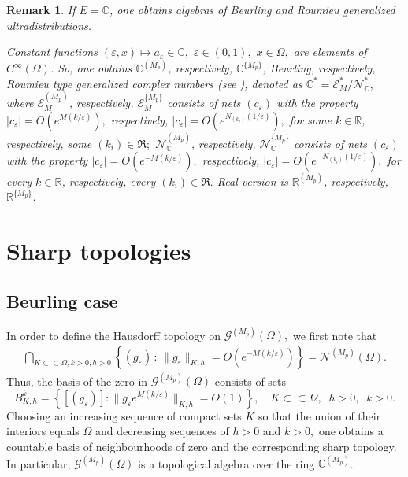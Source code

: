 \documentclass[sn-mathphys,Numbered]{sn-jnl}%
\theoremstyle{thmstyleone}%
\theoremstyle{thmstyletwo}%
\newtheorem{remark}{Remark}%
\theoremstyle{thmstylethree}%
\begin{document}
\begin{remark} \label{tc}
If $E=\mathbb C$, one obtains algebras   of Beurling  and Roumieu generalized ultradistributions.

Constant functions  $(\varepsilon,x)\mapsto a_\varepsilon\in \mathbb{C}, $ $\varepsilon\in(0,1),$  $x\in \Omega,$  are elements of $C^\infty(\Omega)$.  So, one obtains $ \mathbb{C}^{(M_p)}$, respectively, $ \mathbb{C}^{\{M_p\}}$,  Beurling, respectively, Roumieu type generalized complex numbers (see \cite{DHPV,D.V.1}), denoted as $\mathbb C^*=\mathcal E^*_M/\mathcal N^*_\mathbb{C},$ where $\mathcal E_M^{(M_p)}$, respectively, $\mathcal E_M^{\{M_p\}}$ consists of nets  $(c_\varepsilon)$ with the property $|c_\varepsilon|=O(e^{M(k/\varepsilon)}),$ respectively, $|c_\varepsilon|=O(e^{N_{(k_i)}(1/\varepsilon)}),$ for some $k\in \mathbb R$, respectively, some $(k_i)\in\mathfrak R;$  $\mathcal N^{(M_p)}_\mathbb{C}$, respectively, $\mathcal N^{\{M_p\}}_\mathbb{C}$ consists of nets  $(c_\varepsilon)$ with the property $|c_\varepsilon|=O(e^{-M(k/\varepsilon)}),$ respectively,  $|c_\varepsilon|=O(e^{-N_{(k_i)}(1/\varepsilon)}),$ for every $k\in\mathbb R$, respectively, every $(k_i)\in\mathfrak R.$  Real version is $ \mathbb{R}^{(M_p)}$, respectively, $ \mathbb{R}^{\{M_p\}}$.
\end{remark}
 
 
\section{Sharp topologies}

\subsection{Beurling case} \label{BC}

In order to define the Hausdorff topology on $\mathcal{G}^{(M_p)} (\Omega),$ we first  note that
\begin{align*}
\bigcap_{K\subset\subset \Omega,k>0,h>0} \left\{(g_{\varepsilon})\,:\,\|g_{\varepsilon}\|_{K,h} = O(e^{-{M}({k}/{\varepsilon})})\right\}=\mathcal N^{(M_p)}(\Omega).
\end{align*}
Thus,  the basis of the zero in $\mathcal{G}^{(M_p)} (\Omega)$ consists of sets
\begin{equation*}
B_{K,h}^k = \left\{[(g_{\varepsilon})]: \|g_{\varepsilon}e^{{M}({k}/{\varepsilon})}\|_{K,h} =O(1)\right\}, \quad K\subset\subset \Omega , \;\;h>0 ,\;\;k>0. 
\end{equation*}
Choosing an increasing sequence of compact sets $K$ so that the union of their interiors equals $\Omega$ and  decreasing sequences of $h>0$ and $k>0,$ one obtains a countable basis of neighbourhoods of zero and the corresponding sharp topology. In particular, $\mathcal{G}^{(M_p)} (\Omega)$ is a topological algebra over the ring   $\mathbb{C}^{(M_p)}$. 
\end{document}

